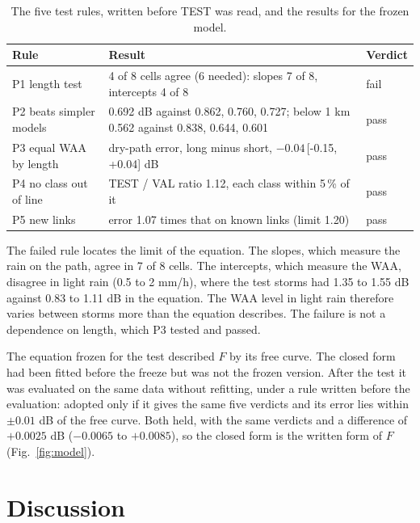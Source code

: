 \documentclass[reprint,aps,pra,amsmath,amssymb,nofootinbib,superscriptaddress]{revtex4-2}
\newcommand{\iv}[2]{\,[#1,\,#2]}
\begin{document}
\begin{table}[t]
\caption{The five test rules, written before TEST was read, and the results for the frozen model.}
\label{tab:rules}
\begin{tabularx}{\textwidth}{lLl}
\toprule
Rule & Result & Verdict\\
\midrule
P1 length test & 4 of 8 cells agree (6 needed): slopes 7 of 8, intercepts 4 of 8 & fail\\
P2 beats simpler models & 0.692 dB against 0.862, 0.760, 0.727; below 1 km 0.562 against 0.838, 0.644, 0.601 & pass\\
P3 equal WAA by length & dry-path error, long minus short, $-0.04$\iv{-0.15}{+0.04} dB & pass\\
P4 no class out of line & TEST / VAL ratio 1.12, each class within 5\,\% of it & pass\\
P5 new links & error 1.07 times that on known links (limit 1.20) & pass\\
\bottomrule
\end{tabularx}
\end{table}

The failed rule locates the limit of the equation. The slopes, which measure the rain on the path, agree in 7 of 8 cells.
The intercepts, which measure the WAA, disagree in light rain (0.5 to 2 mm/h), where the test storms had 1.35 to 1.55 dB
against 0.83 to 1.11 dB in the equation. The WAA level in light rain therefore varies between storms more than the equation
describes. The failure is not a dependence on length, which P3 tested and passed.

The equation frozen for the test described $F$ by its free curve. The closed form had been fitted before the freeze but
was not the frozen version. After the test it was evaluated on the same data without refitting, under a rule written before
the evaluation: adopted only if it gives the same five verdicts and its error lies within $\pm 0.01$ dB of the free curve.
Both held, with the same verdicts and a difference of $+0.0025$ dB ($-0.0065$ to $+0.0085$), so the closed form is the
written form of $F$ (Fig.~\ref{fig:model}).

\section{Discussion}
\label{sec:discussion}
\end{document}
